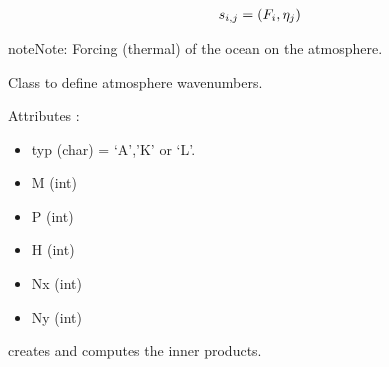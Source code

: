 \documentclass[letterpaper,10pt,english]{sphinxmanual}
\begin{document}
\begin{fulllineitems}
\begin{fulllineitems}
\end{fulllineitems}


\begin{fulllineitems}
\label{rstfiles/inprod_analytic:inprod_analytic.atm_tensors.calculate_s}~\begin{gather}
\begin{split}s_{i,j} = (F_i, \eta_j)\end{split}\notag
\end{gather}
\begin{notice}{note}{Note:}
Forcing (thermal) of the ocean on the atmosphere.
\end{notice}

\end{fulllineitems}


\end{fulllineitems}


\begin{fulllineitems}
\label{rstfiles/inprod_analytic:inprod_analytic.atm_wavenum}
Class to define atmosphere wavenumbers.

Attributes :
\begin{itemize}
\item {} 
typ (char) = `A','K' or `L'.

\item {} 
M (int)

\item {} 
P (int)

\item {} 
H (int)

\item {} 
Nx (int)

\item {} 
Ny (int)

\end{itemize}

\end{fulllineitems}


\begin{fulllineitems}
\label{rstfiles/inprod_analytic:inprod_analytic.init_inprod}
creates and computes the inner products.

\end{fulllineitems}
\end{document}

